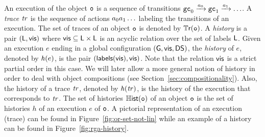 An execution of the object $\mathtt{o}$ is a sequence of transitions $\mathtt{gc}_0\xrightarrow{a_0}\mathtt{gc}_1\xrightarrow{a_1}\ldots$.
A \emph{trace} $\mathit{tr}$ is the sequence of actions $a_0a_1\ldots$ labeling the transitions of an execution.
The set of traces of an object $\mathtt{o}$ is denoted by $\mathbb{T}\mathsf{r}(\mathtt{o})$.
A \emph{history} is a pair $(\mathsf{L},\mathsf{vis})$ where
$\mathsf{vis}\subseteq \mathsf{L}\times\mathsf{L}$ is an acyclic relation over the set of labels $\mathsf{L}$.
Given an execution $e$ ending in a global configuration $(\mathsf{G},
\mathsf{vis}, \mathsf{DS})$, the \emph{history} of $e$, denoted by $\mathit{h}({e)}$, is the pair
$(\mathsf{labels}(\mathsf{vis}), \mathsf{vis})$. Note that the relation $\mathsf{vis}$ is a strict partial order in this case.
We will later allow a more general notion of history in order to deal
with object compositions (see Section~\ref{sec:compositionality}).
Also, the history of a trace $\mathit{tr}$, denoted by $\mathit{h}({\mathit{tr})}$,
is the history of the execution that corresponds to $\mathit{tr}$.
The set of histories $\mathbb{H}\mathsf{ist}(\mathtt{o})$ of an object $\mathtt{o}$ is the
set of histories $h$ of an execution $e$ of $\mathtt{o}$. A pictorial representation
of an execution (trace) can be found in Figure~\ref{fig:or-set-not-lin} while an example of a history
can be found in Figure~\ref{fig:rga-history}.


%

%
%
%
%
%

